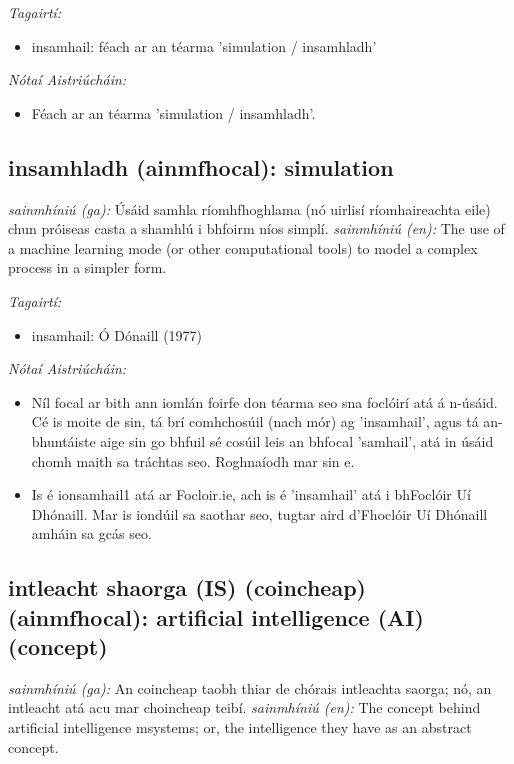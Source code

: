 \documentclass{article}
\begin{document}
 \noindent \textit{Tagairtí:}
\begin{itemize}
	\item insamhail: féach ar an téarma 'simulation / insamhladh'
\end{itemize}

 \noindent \textit{Nótaí Aistriúcháin:}
\begin{itemize}
	\item Féach ar an téarma 'simulation / insamhladh'.
\end{itemize}


\subsection*{insamhladh (ainmfhocal): simulation} 
 \noindent \textit{sainmhíniú (ga):} Úsáid samhla ríomhfhoghlama (nó uirlisí ríomhaireachta eile) chun próiseas casta a shamhlú i bhfoirm níos simplí.
\newline\newline
 \noindent \textit{sainmhíniú (en):} The use of a machine learning mode (or other computational tools) to model a complex process in a simpler form.
\newline

 \noindent \textit{Tagairtí:}
\begin{itemize}
	\item insamhail: Ó Dónaill (1977) \cite{odonaill}
\end{itemize}

 \noindent \textit{Nótaí Aistriúcháin:}
\begin{itemize}
	\item Níl focal ar bith ann iomlán foirfe don téarma seo sna foclóirí atá á n-úsáid. Cé is moite de sin, tá brí comhchosúil (nach mór) ag 'insamhail', agus tá an-bhuntáiste aige sin go bhfuil sé cosúil leis an bhfocal 'samhail', atá in úsáid chomh maith sa tráchtas seo. Roghnaíodh mar sin e.
	\item Is é ionsamhail1 atá ar Focloir.ie, ach is é 'insamhail' atá i bhFoclóir Uí Dhónaill. Mar is iondúil sa saothar seo, tugtar aird d'Fhoclóir Uí Dhónaill amháin sa gcás seo.
\end{itemize}


\subsection*{intleacht shaorga (IS) (coincheap) (ainmfhocal): artificial intelligence (AI) (concept)} 
 \noindent \textit{sainmhíniú (ga):} An coincheap taobh thiar de chórais intleachta saorga; nó, an intleacht atá acu mar choincheap teibí.
\newline\newline
 \noindent \textit{sainmhíniú (en):} The concept behind artificial intelligence msystems; or, the intelligence they have as an abstract concept.
\newline
\end{document}
